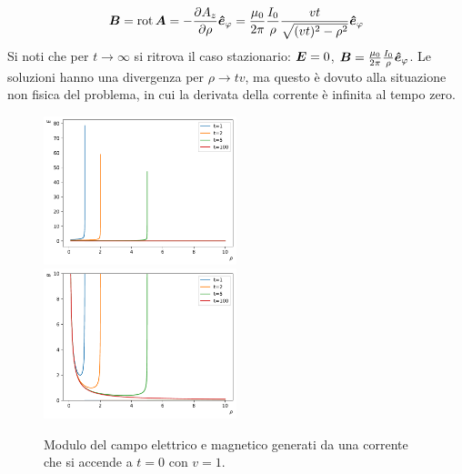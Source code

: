 \begin{Es}
  \begin{align*}
    \boldsymbol{B} = \operatorname{rot}\boldsymbol{A} = -\frac{\partial A_z}{\partial\rho}\boldsymbol{\hat {e}}_\varphi = \frac{\mu_0}{2\pi} \frac{I_0}{\rho}\frac{vt}{\sqrt{(vt)^2-\rho^2}}\boldsymbol{\hat {e}}_\varphi
  \end{align*}
  Si noti che per $t\to\infty$ si ritrova il caso stazionario: $\boldsymbol{E}=0$, $\boldsymbol{B}=\frac{\mu_0}{2\pi}\frac{I_0}{\rho}\boldsymbol{\hat {e}}_\varphi$. Le soluzioni hanno una divergenza per $\rho\to tv$, ma questo è dovuto alla situazione non fisica del problema, in cui la derivata della corrente è infinita al tempo zero.
  \begin{figure}
  \includegraphics[width=0.5\textwidth]{immagini/fisica2/cavo_corrente_potenziali_ritardati_turnon_E.pdf}
  \includegraphics[width=0.5\textwidth]{immagini/fisica2/cavo_corrente_potenziali_ritardati_turnon_B.pdf}
  \caption{Modulo del campo elettrico e magnetico generati da una corrente che si accende a $t=0$ con $v=1$.}
  \end{figure}
\end{Es}

